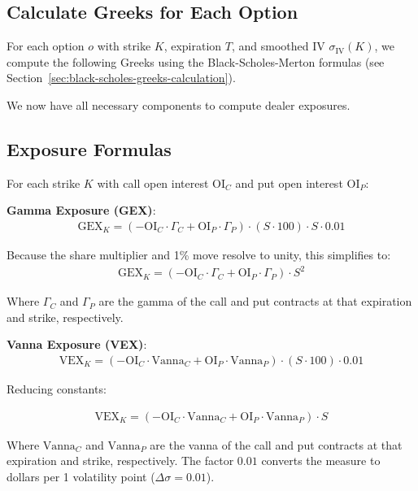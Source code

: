 \documentclass[11pt, a4paper]{article}
\begin{document}
\subsection{Calculate Greeks for Each Option}

For each option $o$ with strike $K$, expiration $T$, and smoothed IV $\sigma_{\text{IV}}(K)$, we compute the following Greeks using the Black-Scholes-Merton formulas (see Section~\ref{sec:black-scholes-greeks-calculation}).

We now have all necessary components to compute dealer exposures.

\subsection{Exposure Formulas}

For each strike $K$ with call open interest $\text{OI}_C$ and put open interest $\text{OI}_P$:

\textbf{Gamma Exposure (GEX)}:
\begin{align}
\text{GEX}_K = \left(-\text{OI}_C \cdot \Gamma_C + \text{OI}_P \cdot \Gamma_P\right) \cdot (S \cdot 100) \cdot S \cdot 0.01
\end{align}

Because the share multiplier and 1\% move resolve to unity, this simplifies to:
\begin{align}
\text{GEX}_K = \left(-\text{OI}_C \cdot \Gamma_C + \text{OI}_P \cdot \Gamma_P\right) \cdot S^2
\end{align}

Where $\Gamma_C$ and $\Gamma_P$ are the gamma of the call and put contracts at that expiration and strike, respectively.

\textbf{Vanna Exposure (VEX)}:
\begin{align}
\text{VEX}_K = \left(-\text{OI}_C \cdot \text{Vanna}_C + \text{OI}_P \cdot \text{Vanna}_P\right) \cdot (S \cdot 100) \cdot 0.01
\end{align}

Reducing constants:

\begin{align}
\text{VEX}_K = \left(-\text{OI}_C \cdot \text{Vanna}_C + \text{OI}_P \cdot \text{Vanna}_P\right) \cdot S
\end{align}

Where $\text{Vanna}_C$ and $\text{Vanna}_P$ are the vanna of the call and put contracts at that expiration and strike, respectively. The factor $0.01$ converts the measure to dollars per 1 volatility point ($\Delta \sigma = 0.01$).
\end{document}
